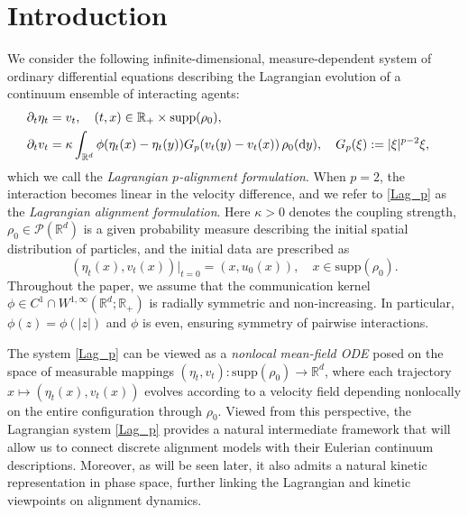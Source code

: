 \documentclass[10pt,reqno]{amsart}
\numberwithin{equation}{section}
\newcommand{\R}{\mathbb R}
\newcommand{\bq}{\begin{equation}}
\newcommand{\eq}{\end{equation}}
\newcommand{\pa}{\partial}
\newcommand{\intr}{\int_{\R^d}}
\newcommand{\calP}{\mathcal P}
\newcommand{\dy}{\textnormal{d}y}
\newcommand{\supp}{\text{supp}}
\begin{document}
\section{Introduction}%
We consider the following infinite-dimensional, measure-dependent system of ordinary differential equations describing the Lagrangian evolution of a continuum ensemble of interacting agents:
\begin{align}\label{Lag_p}
\begin{aligned}
\pa_t \eta_t &= v_t, \quad (t,x) \in \R_+ \times \supp(\rho_0),\cr
\pa_t v_t &=\kappa \intr \phi(\eta_t(x) - \eta_t(y)) G_p(v_t(y) - v_t(x))\,\rho_0(\dy), \quad  G_p(\xi):=|\xi|^{p-2}\xi,
\end{aligned}
\end{align}
which we call the \emph{Lagrangian $p$-alignment formulation}. When $p=2$, the interaction becomes linear in the velocity difference, and we refer to \eqref{Lag_p} as the \emph{Lagrangian alignment formulation}. Here $\kappa>0$ denotes the coupling strength, $\rho_0 \in \calP(\R^d)$ is a given probability measure describing the initial spatial distribution of particles, and the initial data are prescribed as
\bq\label{ini:Lag_p}
(\eta_t(x), v_t(x))|_{t=0} = (x, u_0(x)), \quad x \in \supp(\rho_0).
\eq
Throughout the paper, we assume that the communication kernel $\phi \in C^1 \cap W^{1,\infty}(\R^d;\R_+)$ is radially symmetric and non-increasing. In particular, $\phi(z)=\phi(|z|)$ and $\phi$ is even, ensuring symmetry of
pairwise interactions.

The system \eqref{Lag_p} can be viewed as a \emph{nonlocal mean-field ODE} posed on the space of measurable mappings $(\eta_t,v_t): \supp(\rho_0)\to\R^d$, where each trajectory $x \mapsto (\eta_t(x),v_t(x))$ evolves according to a velocity field depending nonlocally on the entire configuration through $\rho_0$. Viewed from this perspective, the Lagrangian system \eqref{Lag_p} provides a natural intermediate framework that will allow us to connect discrete alignment models with their Eulerian continuum descriptions. Moreover, as will be seen later, it also admits a natural kinetic representation in phase space, further linking the Lagrangian and kinetic viewpoints on alignment dynamics.
\end{document}
